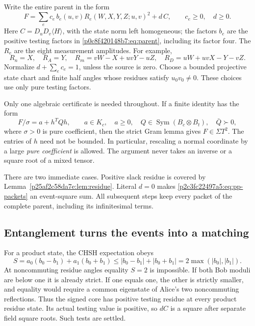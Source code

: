 Write the entire parent in the form
\begin{equation}\label{p2c3fc22497a5:eq:pp-packets}
 F=\sum_{e}c_e\,b_e(u,v)R_e(W,X,Y,Z;u,v)^2+d\,C,
 \qquad c_e\geq0,\quad d\geq0.
\end{equation}
Here $C=D_uD_v\langle H\rangle$, with the state norm left homogeneous;
the factors $b_e$ are the positive testing factors in
\eqref{p0c8f420148b7:eq:parent}, including its factor four.  The $R_e$ are the eight
measurement amplitudes.  For example,
\[
 R_n=X,\quad R_A=Y,\quad
 R_m=vW-X+uvY-uZ,\quad
 R_D=uW+uvX-Y-vZ.
\]
Normalize $d+\sum_e c_e=1$, unless the source is zero.  Choose a bounded
projective state chart and finite half angles whose residues satisfy
$u_0v_0\ne0$.  These choices use only pure testing factors.

Only one algebraic certificate is needed throughout.  If a finite identity
has the form
\begin{equation}\label{p2c3fc22497a5:eq:pp-strict}
 F/\sigma=a+h^TQh,\qquad a\in K_c,\quad a\geq0,
 \quad Q\in\operatorname{Sym}(B_c\otimes B_t),\quad\bar Q\succ0,
\end{equation}
where $\sigma>0$ is pure coefficient, then the strict Gram lemma gives
$F\in\Sigma T^2$.  The entries of $h$ need not be bounded.  In particular,
rescaling a normal coordinate by a large \emph{pure coefficient} is allowed.
The argument never takes an inverse or a square root of a mixed tensor.

There are two immediate cases.  Positive slack residue is covered by
Lemma~\ref{p25af2c58da7e:lem:residue}.  Literal $d=0$ makes
\eqref{p2c3fc22497a5:eq:pp-packets} an event-square sum.  All subsequent steps keep every
packet of the complete parent, including its infinitesimal terms.

\subsection{Entanglement turns the events into a matching}
For a product state, the CHSH expectation obeys
\[
 S=a_0(b_0-b_1)+a_1(b_0+b_1)
 \leq |b_0-b_1|+|b_0+b_1|=2\max(|b_0|,|b_1|).
\]
At noncommuting residue angles equality $S=2$ is impossible.  If both Bob
moduli are below one it is already strict.  If one equals one, the other is
strictly smaller, and equality would require a common eigenstate of Alice's
two noncommuting reflections.  Thus the signed core has positive testing
residue at every product residue state.  Its actual testing value is positive,
so $dC$ is a square after separate field square roots.  Such tests are settled.


